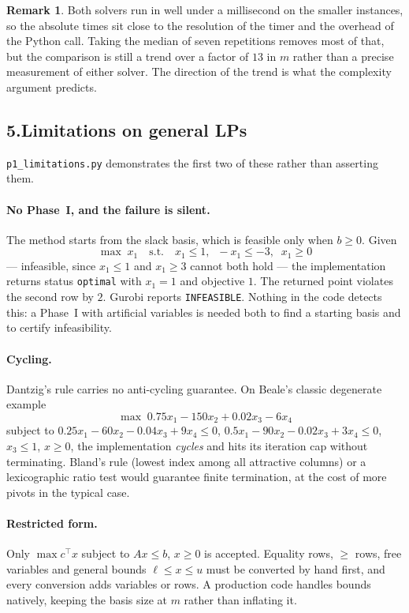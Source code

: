 \documentclass[11pt]{article}
\DeclareMathOperator*{\maximize}{max}
\theoremstyle{definition}
\newtheorem{remark}{Remark}
\theoremstyle{plain}
\begin{document}
\begin{remark}
Both solvers run in well under a millisecond on the smaller instances,
so the absolute times sit close to the resolution of the timer and the
overhead of the Python call. Taking the median of seven repetitions
removes most of that, but the comparison is still a trend over a factor
of $13$ in $m$ rather than a precise measurement of either solver. The
direction of the trend is what the complexity argument predicts.
\end{remark}

\subsection*{5.\quad Limitations on general LPs}

\texttt{p1\_limitations.py} demonstrates the first two of these rather
than asserting them.

\paragraph{No Phase~I, and the failure is silent.} The method starts
from the slack basis, which is feasible only when $b \ge 0$. Given
\[
  \maximize \; x_1 \quad \text{s.t.} \quad
  x_1 \le 1, \;\; -x_1 \le -3, \;\; x_1 \ge 0
\]
--- infeasible, since $x_1 \le 1$ and $x_1 \ge 3$ cannot both hold ---
the implementation returns status \texttt{optimal} with $x_1 = 1$ and
objective $1$. The returned point violates the second row by $2$.
Gurobi reports \texttt{INFEASIBLE}. Nothing in the code detects this: a
Phase~I with artificial variables is needed both to find a starting
basis and to certify infeasibility.

\paragraph{Cycling.} Dantzig's rule carries no anti-cycling guarantee.
On Beale's classic degenerate example
\[
  \maximize \; 0.75x_1 - 150x_2 + 0.02x_3 - 6x_4
\]
subject to $0.25x_1 - 60x_2 - 0.04x_3 + 9x_4 \le 0$,
$0.5x_1 - 90x_2 - 0.02x_3 + 3x_4 \le 0$, $x_3 \le 1$, $x \ge 0$, the
implementation \emph{cycles} and hits its iteration cap without
terminating. Bland's rule (lowest index among all attractive columns) or
a lexicographic ratio test would guarantee finite termination, at the
cost of more pivots in the typical case.

\paragraph{Restricted form.} Only $\max c^{\!\top}x$ subject to
$Ax \le b$, $x \ge 0$ is accepted. Equality rows, $\ge$ rows, free
variables and general bounds $\ell \le x \le u$ must be converted by
hand first, and every conversion adds variables or rows. A production
code handles bounds natively, keeping the basis size at $m$ rather than
inflating it.
\end{document}
